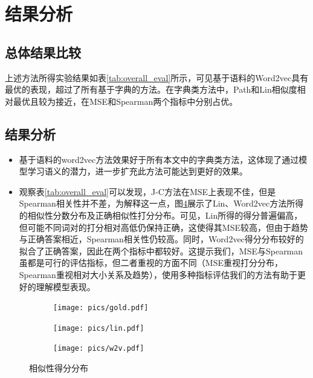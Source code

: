 \documentclass{article}
\begin{document}
\section{结果分析}
\subsection{总体结果比较}
上述方法所得实验结果如表\ref{tab:overall_eval}所示，可见基于语料的Word2vec具有最优的表现，超过了所有基于字典的方法。在字典类方法中，Path和Lin相似度相对最优且较为接近，在MSE和Spearman两个指标中分别占优。

\subsection{结果分析}
\begin{itemize}
  \item 基于语料的word2vec方法效果好于所有本文中的字典类方法，这体现了通过模型学习语义的潜力，进一步扩充此方法可能达到更好的效果。
  \item 观察表\ref{tab:overall_eval}可以发现，J-C方法在MSE上表现不佳，但是Spearman相关性并不差，为解释这一点，图\ref{fig:distrib}展示了Lin、Word2vec方法所得的相似性分数分布及正确相似性打分分布。可见，Lin所得的得分普遍偏高，但可能不同词对的打分相对高低仍保持正确，这使得其MSE较高，但由于趋势与正确答案相近，Spearman相关性仍较高。同时，Word2vec得分分布较好的拟合了正确答案，因此在两个指标中都较好。这提示我们，MSE与Spearman虽都是可行的评估指标，但二者重视的方面不同（MSE重视打分分布，Spearman重视相对大小关系及趋势），使用多种指标评估我们的方法有助于更好的理解模型表现。
\end{itemize}


\begin{figure}[h]
  \begin{subfigure}{.42\textwidth}
    \texttt{[image: pics/gold.pdf]}
    \caption{}
    \label{fig:gold}
  \end{subfigure}
  \hfill
  \begin{subfigure}{.42\textwidth}
    \texttt{[image: pics/lin.pdf]}
    \caption{}
    \label{fig:lin}
  \end{subfigure}
  \begin{subfigure}{.42\textwidth}
    \centering
    \texttt{[image: pics/w2v.pdf]}
    \caption{}
    \label{fig:w2v}
  \end{subfigure}%
  \caption{相似性得分分布}
  \label{fig:distrib}
  \end{figure}


\end{document}
